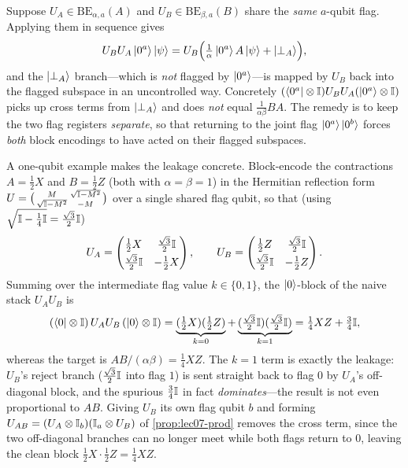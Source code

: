 \begin{remark}
\label{rem:lec07-naive}
Suppose $U_A\in\mathrm{BE}_{\alpha,a}(A)$ and $U_B\in\mathrm{BE}_{\beta,a}(B)$ share
the \emph{same} $a$-qubit flag. Applying them in sequence gives
\[
  U_B U_A\ket{0^a}\ket\psi
  =U_B\Bigl(\tfrac{1}{\alpha}\ket{0^a}A\ket\psi+\ket{\perp_A}\Bigr),
\]
and the $\ket{\perp_A}$ branch---which is \emph{not} flagged by $\ket{0^a}$---is
mapped by $U_B$ back into the flagged subspace in an uncontrolled way. Concretely
$(\bra{0^a}\otimes\mathbb{I})U_BU_A(\ket{0^a}\otimes\mathbb{I})$ picks up cross terms from
$\ket{\perp_A}$ and does \emph{not} equal $\frac{1}{\alpha\beta}BA$. The remedy is to
keep the two flag registers \emph{separate}, so that returning to the joint flag
$\ket{0^{a}}\ket{0^{b}}$ forces \emph{both} block encodings to have acted on their
flagged subspaces.

A one-qubit example makes the leakage concrete. Block-encode the contractions
$A=\tfrac12 X$ and $B=\tfrac12 Z$ (both with $\alpha=\beta=1$) in the Hermitian
reflection form $U=\bigl(\begin{smallmatrix}M & \sqrt{\mathbb{I}-M^2}\\ \sqrt{\mathbb{I}-M^2} & -M\end{smallmatrix}\bigr)$
over a single shared flag qubit, so that (using $\sqrt{\mathbb{I}-\tfrac14\mathbb{I}}=\tfrac{\sqrt3}{2}\mathbb{I}$)
\[
  U_A=\begin{pmatrix}\tfrac12 X & \tfrac{\sqrt3}{2}\mathbb{I}\\[2pt] \tfrac{\sqrt3}{2}\mathbb{I} & -\tfrac12 X\end{pmatrix},
  \qquad
  U_B=\begin{pmatrix}\tfrac12 Z & \tfrac{\sqrt3}{2}\mathbb{I}\\[2pt] \tfrac{\sqrt3}{2}\mathbb{I} & -\tfrac12 Z\end{pmatrix}.
\]
Summing over the intermediate flag value $k\in\{0,1\}$, the $\ket0$-block of the
naive stack $U_AU_B$ is
\[
  (\bra0\otimes\mathbb{I})\,U_AU_B\,(\ket0\otimes\mathbb{I})
  =\underbrace{(\tfrac12 X)(\tfrac12 Z)}_{k=0}
  +\underbrace{(\tfrac{\sqrt3}{2}\mathbb{I})(\tfrac{\sqrt3}{2}\mathbb{I})}_{k=1}
  =\tfrac14 XZ+\tfrac34\mathbb{I},
\]
whereas the target is $AB/(\alpha\beta)=\tfrac14 XZ$. The $k=1$ term is exactly the
leakage: $U_B$'s reject branch ($\tfrac{\sqrt3}{2}\mathbb{I}$ into flag $1$) is sent straight
back to flag $0$ by $U_A$'s off-diagonal block, and the spurious $\tfrac34\mathbb{I}$ in fact
\emph{dominates}---the result is not even proportional to $AB$. Giving $U_B$ its own
flag qubit $b$ and forming $U_{AB}=(U_A\otimes\mathbb{I}_b)(\mathbb{I}_a\otimes U_B)$ of
\cref{prop:lec07-prod} removes the cross term, since the two off-diagonal branches can
no longer meet while both flags return to $0$, leaving the clean block
$\tfrac12 X\cdot\tfrac12 Z=\tfrac14 XZ$.
\end{remark}

